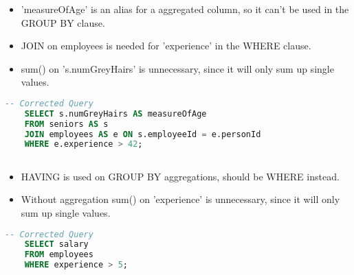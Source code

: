 \begin{itemize}
	\item 'measureOfAge' is an alias for a aggregated column, so it can't be used in the GROUP BY clause.
	\item JOIN on employees is needed for 'experience' in the WHERE clause.
	\item sum() on 's.numGreyHairs' is unnecessary, since it will only sum up single values.
\end{itemize}

\begin{lstlisting}[language=SQL]
	-- Corrected Query
	SELECT s.numGreyHairs AS measureOfAge
	FROM seniors AS s
	JOIN employees AS e ON s.employeeId = e.personId
	WHERE e.experience > 42;
\end{lstlisting}

\subsection{}

\begin{itemize}
	\item HAVING is used on GROUP BY aggregations, should be WHERE instead.
	\item Without aggregation sum() on 'experience' is unnecessary, since it will only sum up single values.
\end{itemize}

\begin{lstlisting}[language=SQL]
	-- Corrected Query
	SELECT salary
	FROM employees
	WHERE experience > 5;
\end{lstlisting}

